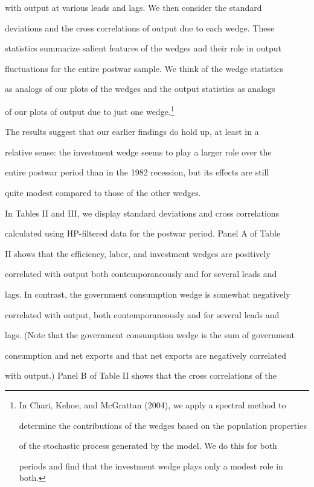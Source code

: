 \documentclass[fleqn,leqno,11pt]{article}
\begin{document}
with output at various leads and lags. We then consider the standard

deviations and the cross correlations of output due to each wedge. These

statistics summarize salient features of the wedges and their role in output

fluctuations for the entire postwar sample. We think of the wedge statistics

as analogs of our plots of the wedges and the output statistics as analogs

of our plots of output due to just one wedge.\footnote{%

In Chari, Kehoe, and McGrattan (2004), we apply a spectral method to

determine the contributions of the wedges based on the population properties

of the stochastic process generated by the model. We do this for both

periods and find that the investment wedge plays only a modest role in both.}

The results suggest that our earlier findings do hold up, at least in a

relative sense: the investment wedge seems to play a larger role over the

entire postwar period than in the 1982 recession, but its effects are still

quite modest compared to those of the other wedges.



In Tables II and III, we display standard deviations and cross correlations

calculated using HP-filtered data for the postwar period. Panel A of Table

II shows that the efficiency, labor, and investment wedges are positively

correlated with output both contemporaneously and for several leads and

lags. In contrast, the government consumption wedge is somewhat negatively

correlated with output, both contemporaneously and for several leads and

lags. (Note that the government consumption wedge is the sum of government

consumption and net exports and that net exports are negatively correlated

with output.) Panel B of Table II shows that the cross correlations of the
\end{document}

